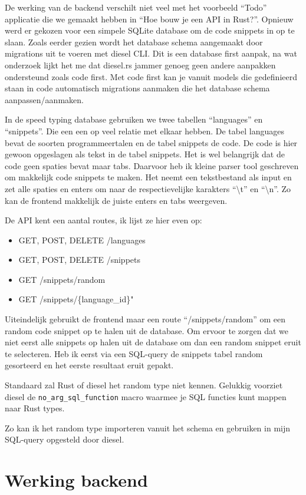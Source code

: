 De werking van de backend verschilt niet veel met het voorbeeld “Todo” applicatie die we gemaakt
hebben in “Hoe bouw je een API in Rust?”. Opnieuw werd er gekozen voor een simpele SQLite database
om de code snippets in op te slaan. Zoals eerder gezien wordt het database schema aangemaakt door
migrations uit te voeren met diesel CLI.  Dit is een database first aanpak, na wat onderzoek lijkt
het me dat diesel.rs jammer genoeg geen andere aanpakken ondersteund zoals code first. Met code
first kan je vanuit models die gedefinieerd staan in code automatisch migrations aanmaken die het
database schema aanpassen/aanmaken. 

In de speed typing database gebruiken we twee tabellen “languages” en “snippets”. Die een een op
veel relatie met elkaar hebben. De tabel languages bevat de soorten programmeertalen en de tabel
snippets de code. De code is hier gewoon opgeslagen als tekst in de tabel snippets. Het is wel
belangrijk dat de code geen spaties bevat maar tabs. Daarvoor heb ik kleine parser tool geschreven
om makkelijk code snippets te maken. Het neemt een tekstbestand als input en zet alle spaties en
enters om naar de respectievelijke karakters “\textbackslash t” en “\textbackslash n”. Zo kan de
frontend makkelijk de juiste enters en tabs weergeven. 

De API kent een aantal routes, ik lijst ze hier even op: 
\begin{itemize}
    \item GET, POST, DELETE  /languages
    \item GET, POST, DELETE /snippets 
    \item GET /snippets/random 
    \item GET /snippets/\{language\_id\}"
\end{itemize}

Uiteindelijk gebruikt de frontend maar een route “/snippets/random” om een random code snippet op te
halen uit de database. Om ervoor te zorgen dat we niet eerst alle snippets op halen uit de database
om dan een random snippet eruit te selecteren. Heb ik eerst via een SQL-query de snippets tabel
random gesorteerd en het eerste resultaat eruit gepakt.  

Standaard zal Rust of diesel het random type niet kennen. Gelukkig voorziet diesel de
\texttt{no_arg_sql_function} macro waarmee je SQL functies kunt mappen naar Rust types.

Zo kan ik het random type importeren vanuit het schema en gebruiken in mijn SQL-query opgesteld door diesel.

\section{Werking backend}
